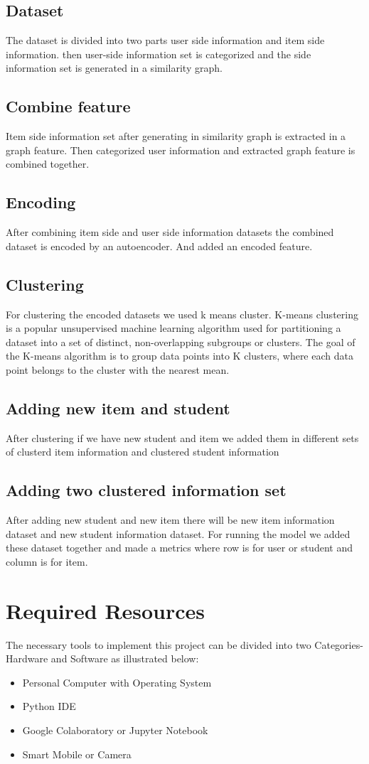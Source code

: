\subsection{Dataset}
The dataset is divided into two parts user side information and item side information. then user-side information set is categorized and the side information set is generated in a similarity graph.
\subsection{Combine feature}
Item side information set after generating in similarity graph is extracted in a graph feature. Then categorized user information and extracted graph feature is combined together.
\subsection{Encoding}
After combining item side and user side information datasets the combined dataset is encoded by an autoencoder. And added an encoded feature.
\subsection{Clustering}
For clustering the encoded datasets we used k means cluster. K-means clustering is a popular unsupervised machine learning algorithm used for partitioning a dataset into a set of distinct, non-overlapping subgroups or clusters. The goal of the K-means algorithm is to group data points into K clusters, where each data point belongs to the cluster with the nearest mean.
\subsection{Adding new item and student}
After clustering if we have new student and item we added them in different sets of clusterd item information and clustered student information
\subsection{Adding two clustered information set}
After adding new student and new item there will be new item information dataset and new student information dataset. For running the model we added these dataset together and made a metrics where row is for user or student and column is for item.


\section{Required Resources}
The necessary tools to implement this project can be divided into two Categories- Hardware and Software as illustrated below:  
\begin{itemize}
    \item Personal Computer with Operating System 
    \item Python IDE
    \item Google Colaboratory or Jupyter Notebook
    \item Smart Mobile or Camera
\end{itemize}

